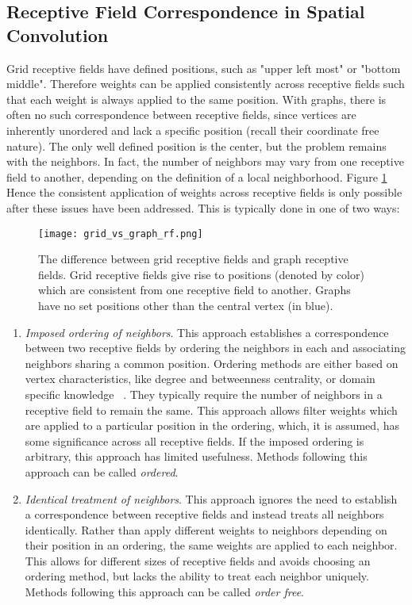 \subsection{Receptive Field Correspondence in Spatial Convolution}


Grid receptive fields have defined positions, such as "upper left most" or "bottom middle".
Therefore weights can be applied consistently across receptive fields such that each weight is always applied to the same position.
With graphs, there is often no such correspondence between receptive fields, since vertices are inherently unordered and lack a specific position (recall their coordinate free nature).
The only well defined position is the center, but the problem remains with the neighbors.
In fact, the number of neighbors may vary from one receptive field to another, depending on the definition of a local neighborhood.
Figure \ref{fig:grid_vs_graph_rf}
Hence the consistent application of weights across receptive fields is only possible after these issues have been addressed.
This is typically done in one of two ways:

\begin{figure}
\texttt{[image: grid\_vs\_graph\_rf.png]}
\caption{The difference between grid receptive fields and graph receptive fields. Grid receptive fields give rise to positions (denoted by color) which are consistent from one receptive field to another. Graphs have no set positions other than the central vertex (in blue).}
\label{fig:grid_vs_graph_rf}
\end{figure}

\begin{enumerate}
	\item \textit{Imposed ordering of neighbors}. This approach establishes a correspondence between two receptive fields by ordering the neighbors in each and associating neighbors sharing a common position. 
	Ordering methods are either based on vertex characteristics, like degree and betweenness centrality, or domain specific knowledge ~\cite{niepert2016, duvenaud2015}.
	They typically require the number of neighbors in a receptive field to remain the same.
	This approach allows filter weights which are applied to a particular position in the ordering, which, it is assumed, has some significance across all receptive fields.
	If the imposed ordering is arbitrary, this approach has limited usefulness.
	Methods following this approach can be called \emph{ordered}.
	
	\item \textit{Identical treatment of neighbors}. This approach ignores the need to establish a correspondence between receptive fields and instead treats all neighbors identically.
	Rather than apply different weights to neighbors depending on their position in an ordering, the same weights are applied to each neighbor.
	This allows for different sizes of receptive fields and avoids choosing an ordering method, but lacks the ability to treat each neighbor uniquely.
	Methods following this approach can be called \emph{order free}.
\end{enumerate}

